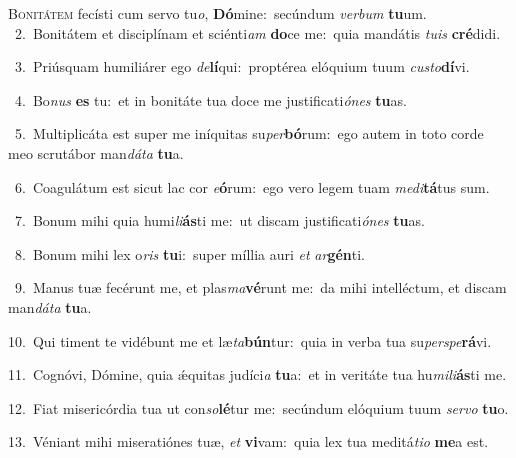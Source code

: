 \lettrine{\initial\textcolor{\initialcolor}{B}}{onitátem} fecísti cum servo tu\-\textit{o}\-, \textbf{Dó}\-mine:~\star secúndum \textit{ver}\-\textit{bum} \textbf{tu}\-um.\\
{\numbfont\textcolor{\numbcolor}{~2.}}~Bonitátem et disciplínam et sciénti\textit{am} \textbf{do}\-ce me:~\star quia mandátis \textit{tu}\-\textit{is} \textbf{cré}\-didi.\par
{\numbfont\textcolor{\numbcolor}{~3.}}~Priúsquam humiliárer ego \textit{de}\-\textbf{lí}qui:~\star proptérea elóquium tuum \textit{cus}\-\textit{to}\textbf{dí}vi.\par
{\numbfont\textcolor{\numbcolor}{~4.}}~Bo\textit{nus} \textbf{es} tu:~\star et in bonitáte tua doce me justificati\-\textit{ó}\-\textit{nes} \textbf{tu}\-as.\par
{\numbfont\textcolor{\numbcolor}{~5.}}~Multiplicáta est super me iníquitas su\-\textit{per}\-\textbf{bó}rum:~\star ego autem in toto corde meo scrutábor man\-\textit{dá}\-\textit{ta} \textbf{tu}\-a.\par
{\numbfont\textcolor{\numbcolor}{~6.}}~Coagulátum est sicut lac cor \textit{e}\-\textbf{ó}rum:~\star ego vero legem tuam \textit{me}\-\textit{di}\textbf{tá}tus sum.\par
{\numbfont\textcolor{\numbcolor}{~7.}}~Bonum mihi quia humi\-\textit{li}\-\textbf{ás}ti me:~\star ut discam justificati\-\textit{ó}\-\textit{nes} \textbf{tu}\-as.\par
{\numbfont\textcolor{\numbcolor}{~8.}}~Bonum mihi lex o\textit{ris} \textbf{tu}\-i:~\star super míllia auri \textit{et} \textit{ar}\-\textbf{gén}ti.\par
{\numbfont\textcolor{\numbcolor}{~9.}}~Manus tuæ fecérunt me, et plas\-\textit{ma}\-\textbf{vé}runt me:~\star da mihi intelléctum, et discam man\-\textit{dá}\-\textit{ta} \textbf{tu}\-a.\par
{\numbfont\textcolor{\numbcolor}{10.}}~Qui timent te vidébunt me et læ\-\textit{ta}\-\textbf{bún}tur:~\star quia in verba tua su\-\textit{per}\-\textit{spe}\textbf{rá}vi.\par
{\numbfont\textcolor{\numbcolor}{11.}}~Cognóvi, Dómine, quia ǽquitas judíci\textit{a} \textbf{tu}\-a:~\star et in veritáte tua hu\-\textit{mi}\-\textit{li}\textbf{ás}ti me.\par
{\numbfont\textcolor{\numbcolor}{12.}}~Fiat misericórdia tua ut con\-\textit{so}\-\textbf{lé}tur me:~\star secúndum elóquium tuum \textit{ser}\-\textit{vo} \textbf{tu}\-o.\par
{\numbfont\textcolor{\numbcolor}{13.}}~Véniant mihi miseratiónes tuæ, \textit{et} \textbf{vi}\-vam:~\star quia lex tua meditá\-\textit{ti}\-\textit{o} \textbf{me}\-a est.\par
